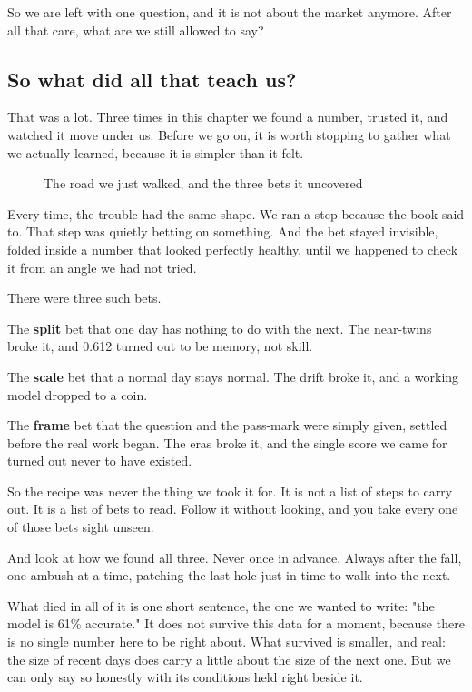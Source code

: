 \documentclass[11pt]{article} %
\begin{document}
So we are left with one question, and it is not about the market anymore. After all that care, what are we still allowed to say?


\subsection{So what did all that teach us?}


That was a lot. Three times in this chapter we found a number, trusted it, and watched it move under us. Before we go on, it is worth stopping to gather what we actually learned, because it is simpler than it felt.

\begin{figure}[htbp]
\centering

\caption{The road we just walked, and the three bets it uncovered}
\end{figure}


Every time, the trouble had the same shape. We ran a step because the book said to. That step was quietly betting on something. And the bet stayed invisible, folded inside a number that looked perfectly healthy, until we happened to check it from an angle we had not tried.

There were three such bets.

The \textbf{split} bet that one day has nothing to do with the next. The near-twins broke it, and 0.612 turned out to be memory, not skill.

The \textbf{scale} bet that a normal day stays normal. The drift broke it, and a working model dropped to a coin.

The \textbf{frame} bet that the question and the pass-mark were simply given, settled before the real work began. The eras broke it, and the single score we came for turned out never to have existed.

So the recipe was never the thing we took it for. It is not a list of steps to carry out. It is a list of bets to read. Follow it without looking, and you take every one of those bets sight unseen.

And look at how we found all three. Never once in advance. Always after the fall, one ambush at a time, patching the last hole just in time to walk into the next.

What died in all of it is one short sentence, the one we wanted to write: "the model is 61\% accurate." It does not survive this data for a moment, because there is no single number here to be right about. What survived is smaller, and real: the size of recent days does carry a little about the size of the next one. But we can only say so honestly with its conditions held right beside it.
\end{document}
